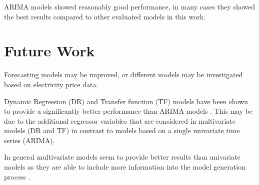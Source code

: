 




ARIMA models showed reasonably good performance, in many cases they showed the best results compared to other evaluated models in this work. 



\section{Future Work}


Forecasting models may be improved, or different models may be investigated based on electricity price data. 

Dynamic Regression (DR) and Transfer function (TF) models have been shown to provide a significantly better performance than ARIMA models \cite{aggarwal2009electricity,weron2005forecasting}. This may be due to the additional regressor variables that are considered in multivariate models (DR and TF) in contrast to models based on a single univariate time series (ARIMA). 

In general multivariate models seem to provide better results than univariate models as they are able to include more information into the model generation process \cite{weron2005forecasting}. 
